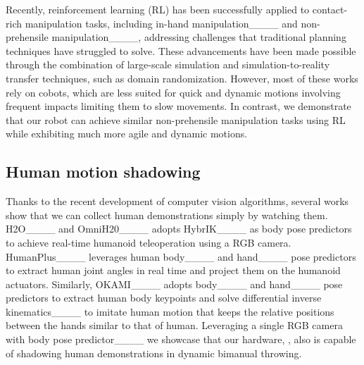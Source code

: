 Recently, reinforcement learning (RL) has been successfully applied to contact-rich manipulation tasks, including in-hand manipulation____ and non-prehensile manipulation____, addressing challenges that traditional planning techniques have struggled to solve. These advancements have been made possible through the combination of large-scale simulation and simulation-to-reality transfer techniques, such as domain randomization. However, most of these works rely on cobots, which are less suited for quick and dynamic motions involving frequent impacts limiting them to slow movements. In contrast, we demonstrate that our robot can achieve similar non-prehensile manipulation tasks using RL while exhibiting much more agile and dynamic motions.

\subsection{Human motion shadowing}

Thanks to the recent development of computer vision algorithms, several works show that we can collect human demonstrations simply by watching them. H2O____ and OmniH20____ adopts HybrIK____ as body pose predictors to achieve real-time humanoid teleoperation using a RGB camera. HumanPlus____ leverages human body____ and hand____ pose predictors to extract human joint angles in real time and project them on the humanoid actuators. Similarly, OKAMI____ adopts body____ and hand____ pose predictors to extract human body keypoints and solve differential inverse kinematics____ to imitate human motion that keeps the relative positions between the hands similar to that of human. Leveraging a single RGB camera with body pose predictor____ we showcase that our hardware, \robot, also is capable of shadowing human demonstrations in dynamic bimanual throwing.